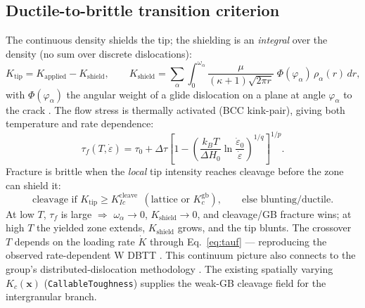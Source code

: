 \documentclass[11pt]{article}
\newcommand{\xvec}{\mathbf{x}}
\begin{document}
\subsection{Ductile-to-brittle transition criterion}
The continuous density shields the tip; the shielding is an \emph{integral} over
the density (no sum over discrete dislocations):
\begin{equation}
K_{\mathrm{tip}}=K_{\mathrm{applied}}-K_{\mathrm{shield}},
\qquad
K_{\mathrm{shield}}=\sum_{\alpha}\int_{0}^{\omega_{\alpha}}
\frac{\mu}{(\kappa+1)\sqrt{2\pi r}}\;\Phi(\varphi_\alpha)\,\rho_{\alpha}(r)\,dr ,
\label{eq:shield}
\end{equation}
with $\Phi(\varphi_\alpha)$ the angular weight of a glide dislocation on a plane
at angle $\varphi_\alpha$ to the crack \citep{rice_thomson1974,weertman1996}. The
flow stress is thermally activated (BCC kink-pair), giving both temperature and
rate dependence:
\begin{equation}
\tau_f(T,\dot\varepsilon)=\tau_0+\Delta\tau\!\left[1-\!\left(\frac{k_BT}{\Delta H_0}
\ln\frac{\dot\varepsilon_0}{\dot\varepsilon}\right)^{1/q}\right]^{1/p}.
\label{eq:tauf}
\end{equation}
Fracture is brittle when the \emph{local} tip intensity reaches cleavage before
the zone can shield it:
\begin{equation}
\text{cleavage if } K_{\mathrm{tip}}\ge K_{Ic}^{\mathrm{cleave}}
\ \ (\text{lattice or } K_c^{\mathrm{gb}}),
\qquad
\text{else blunting/ductile.}
\label{eq:dbtt}
\end{equation}
At low $T$, $\tau_f$ is large $\Rightarrow$ $\omega_{\alpha}\!\to\!0$,
$K_{\mathrm{shield}}\!\to\!0$, and cleavage/GB fracture wins; at high $T$ the
yielded zone extends, $K_{\mathrm{shield}}$ grows, and the tip blunts. The
crossover $T$ depends on the loading rate $\dot K$ through
Eq.~\eqref{eq:tauf} --- reproducing the observed rate-dependent W DBTT
\citep{giannattasio_roberts2007,gumbsch1998,hirsch_roberts1991,
hartmaier_gumbsch2005}. This continuum picture also connects to the group's
distributed-dislocation methodology \citep{ghoniem2000parametric,ghoniem_affine}.
The existing spatially varying $K_c(\xvec)$ (\texttt{CallableToughness}) supplies
the weak-GB cleavage field for the intergranular branch.
\end{document}
